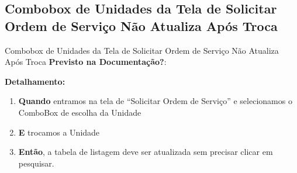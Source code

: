 \subsection{Combobox de Unidades da Tela de Solicitar Ordem de Serviço Não Atualiza Após Troca}
\begin{falha}[1]{Combobox de Unidades da Tela de Solicitar Ordem de Serviço Não Atualiza Após Troca}
	\textbf{Previsto na Documentação?}: \mschecknao
	
	\tcblower
	
	\textbf{Detalhamento:}
	\begin{enumerate}
		\item \textbf{Quando} entramos na tela de ``Solicitar Ordem de Serviço'' e selecionamos o ComboBox de escolha da Unidade
		
		\item \textbf{E} trocamos a Unidade
		
		\item \textbf{Então}, a tabela de listagem deve ser atualizada sem precisar clicar em pesquisar.
	\end{enumerate}
\end{falha}








